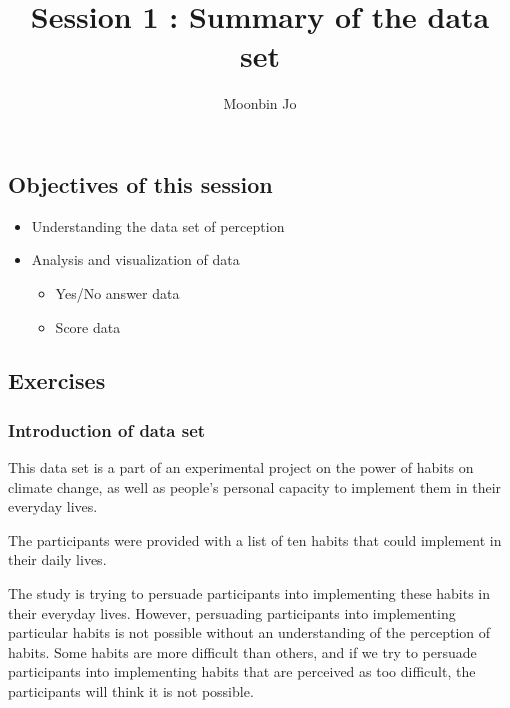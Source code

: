\documentclass[
]{article}
\title{Session 1 : Summary of the data set}
\author{Moonbin Jo}
\date{}
\providecommand{\tightlist}{%
  \setlength{\itemsep}{0pt}\setlength{\parskip}{0pt}}
\begin{document}
\maketitle

\hypertarget{section}{%
\section{}\label{section}}

\hypertarget{objectives-of-this-session}{%
\subsection{Objectives of this
session}\label{objectives-of-this-session}}

\begin{itemize}
\tightlist
\item
  Understanding the data set of perception
\item
  Analysis and visualization of data

  \begin{itemize}
  \tightlist
  \item
    Yes/No answer data
  \item
    Score data
  \end{itemize}
\end{itemize}

\hypertarget{exercises}{%
\subsection{Exercises}\label{exercises}}

\hypertarget{introduction-of-data-set}{%
\subsubsection{Introduction of data
set}\label{introduction-of-data-set}}

This data set is a part of an experimental project on the power of
habits on climate change, as well as people's personal capacity to
implement them in their everyday lives.

The participants were provided with a list of ten habits that could
implement in their daily lives.

The study is trying to persuade participants into implementing these
habits in their everyday lives. However, persuading participants into
implementing particular habits is not possible without an understanding
of the perception of habits. Some habits are more difficult than others,
and if we try to persuade participants into implementing habits that are
perceived as too difficult, the participants will think it is not
possible.
\end{document}
